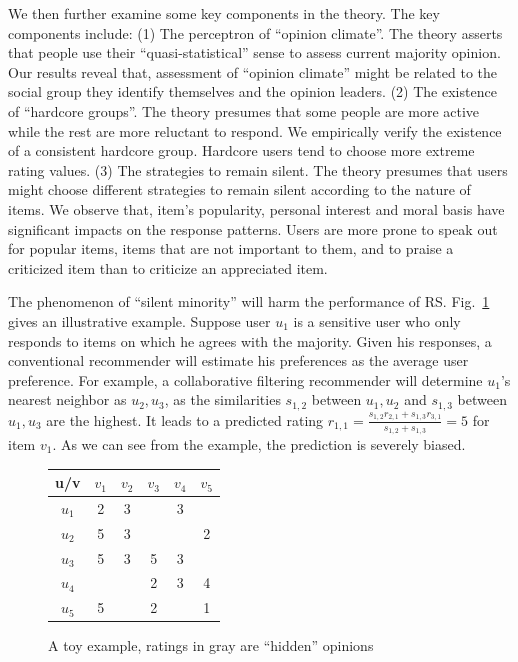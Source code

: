 \documentclass[sigconf]{acmart}
\begin{document}
We then further examine some key components in the theory. The key components include: (1) The perceptron of ``opinion climate''. The theory asserts that people use their ``quasi-statistical'' sense to assess current majority opinion. Our results reveal that, assessment of ``opinion climate'' might be related to the social group they identify themselves and the opinion leaders. (2) The existence of ``hardcore groups''. The theory presumes that some people are more active while the rest are more reluctant to respond. We empirically verify the existence of a consistent hardcore group. Hardcore users tend to choose more extreme rating values. (3) The strategies to remain silent. The theory presumes that users might choose different strategies to remain silent according to the nature of items. We observe that, item's popularity, personal interest and moral basis have significant impacts on the response patterns. Users are more prone to speak out for popular items, items that are not important to them, and to praise a criticized item than to criticize an appreciated item.


The phenomenon of ``silent minority'' will harm the performance of RS. Fig.~\ref{fig:example} gives an illustrative example. Suppose user $u_1$ is a sensitive user who only responds to items on which he agrees with the majority. Given his responses, a conventional recommender will estimate his preferences as the average user preference. For example, a collaborative filtering recommender will determine $u_1$'s nearest neighbor as $u_2,u_3$, as the similarities    $s_{1,2}$ between $u_1,u_2$ and $s_{1,3}$ between $u_1,u_3$ are the highest. It leads to a predicted rating $r_{1,1}=\frac{s_{1,2} r_{2,1}+s_{1,3} r_{3,1}}{s_{1,2}+s_{1,3} }=5$ for item $v_1$. As we can see from the example, the prediction is severely biased.

\begin{figure}
\centering
\tiny
\begin{tabular}{|c|c|c|c|c|c|}
\hline
u/v & $v_1$ & $v_2$ & $v_3$ & $v_4$ & $v_5$ \\\hline\hline
 $u_1$ & \color{mygray}2 & 3 & & 3 &  \\\hline
 $u_2$ & 5 & 3 & &  &2 \\\hline
 $u_3$ & 5 & 3 &5 & 3 & \\\hline
 $u_4$ &  &  &2 & 3 & 4 \\\hline
 $u_5$ & 5 &  &2 &  &  1\\\hline
\end{tabular}
\caption{A toy example, ratings in gray are ``hidden'' opinions}\label{fig:example}
\end{figure}
\end{document}
